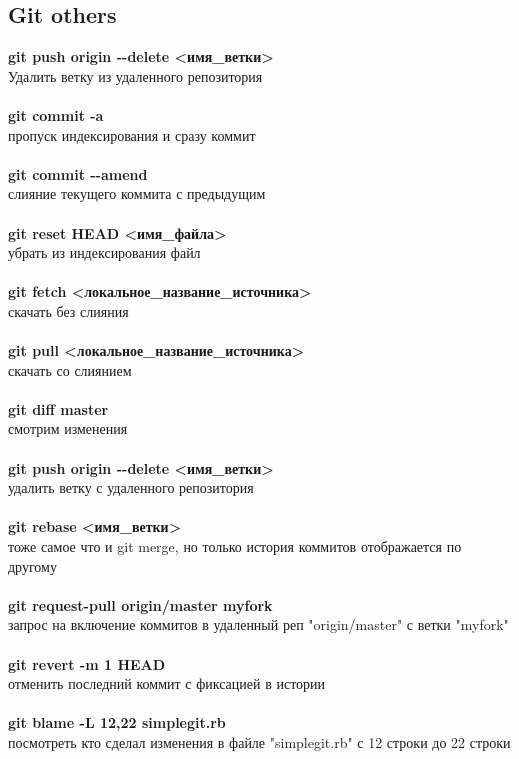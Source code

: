 \documentclass[a4paper, 12px]{article}
\begin{document}
\subsection{Git others}

\textbf{git push origin -\--delete <имя\_ветки>}\\Удалить ветку из удаленного репозитория\\\\
\textbf{git commit -a}\\пропуск индексирования и сразу коммит\\\\
\textbf{git commit -\--amend}\\слияние текущего коммита с предыдущим\\\\
\textbf{git reset HEAD <имя\_файла>}\\убрать из индексирования файл\\\\
\textbf{git fetch <локальное\_название\_источника>}\\скачать без слияния\\\\ 
\textbf{git pull <локальное\_название\_источника>}\\скачать со слиянием\\\\
\textbf{git diff master}\\смотрим изменения\\\\
\textbf{git push origin -\--delete <имя\_ветки>}\\удалить ветку с удаленного репозитория\\\\
\textbf{git rebase <имя\_ветки>}\\тоже самое что и git merge, но только история коммитов отображается по другому\\\\
\textbf{git request-pull origin/master myfork}\\запрос на включение коммитов в удаленный реп "origin/master" с ветки "myfork"\\\\
\textbf{git revert -m 1 HEAD}\\отменить последний коммит с фиксацией в истории\\\\
\textbf{git blame -L 12,22 simplegit.rb}\\посмотреть кто сделал изменения в файле "simplegit.rb" с 12 строки до 22 строки
\end{document}
